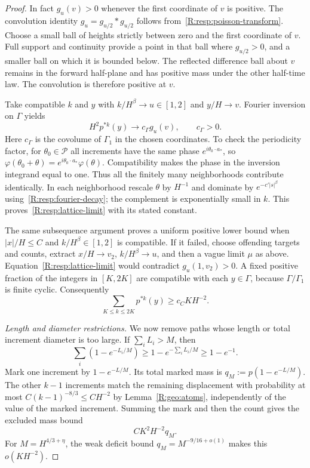 \begin{proof}
In fact $g_u(v)>0$ whenever the first coordinate of $v$ is positive. The convolution identity $g_u=g_{u/2}*g_{u/2}$ follows from~\eqref{R:resp:poisson-transform}. Choose a small ball of heights strictly between zero and the first coordinate of $v$. Full support and continuity provide a point in that ball where $g_{u/2}>0$, and a smaller ball on which it is bounded below. The reflected difference ball about $v$ remains in the forward half-plane and has positive mass under the other half-time law. The convolution is therefore positive at $v$.

Take compatible $k$ and $y$ with $k/H^\beta\to u\in[1,2]$ and $y/H\to v$. Fourier inversion on $\Gamma$ yields
\begin{equation}
 H^2p^{*k}(y)\longrightarrow c_\Gamma g_u(v),
 \qquad c_\Gamma>0.
 \label{R:resp:lattice-limit}
\end{equation}
Here $c_\Gamma$ is the covolume of $\Gamma_1$ in the chosen coordinates. To check the periodicity factor, for $\theta_0\in\mathcal P$ all increments have the same phase $e^{i\theta_0\cdot a_*}$, so
$\varphi(\theta_0+\theta)=e^{i\theta_0\cdot a_*}\varphi(\theta)$. Compatibility makes the phase in the inversion integrand equal to one. Thus all the finitely many neighborhoods contribute identically. In each neighborhood rescale $\theta$ by $H^{-1}$ and dominate by $e^{-c'|s|^\beta}$ using~\eqref{R:resp:fourier-decay}; the complement is exponentially small in $k$. This proves~\eqref{R:resp:lattice-limit} with its stated constant.

The same subsequence argument proves a uniform positive lower bound when $|x|/H\le C$ and $k/H^\beta\in[1,2]$ is compatible. If it failed, choose offending targets and counts, extract $x/H\to v_2$, $k/H^\beta\to u$, and then a vague limit $\mu$ as above. Equation~\eqref{R:resp:lattice-limit} would contradict $g_u(1,v_2)>0$. A fixed positive fraction of the integers in $[K,2K]$ are compatible with each $y\in\Gamma$, because $\Gamma/\Gamma_1$ is finite cyclic. Consequently
\begin{equation}
 \sum_{K\le k\le2K}p^{*k}(y)\ge c_CKH^{-2}.
 \label{R:resp:unrestricted-point}
\end{equation}

\emph{Length and diameter restrictions.} We now remove paths whose length or total increment diameter is too large. If $\sum_iL_i>M$, then
\[
 \sum_i(1-e^{-L_i/M})\ge1-e^{-\sum_iL_i/M}\ge1-e^{-1}.
\]
Mark one increment by $1-e^{-L/M}$. Its total marked mass is $q_M:=p(1-e^{-L/M})$. The other $k-1$ increments match the remaining displacement with probability at most $C(k-1)^{-8/3}\le CH^{-2}$ by Lemma~\ref{R:geo:atoms}, independently of the value of the marked increment. Summing the mark and then the count gives the excluded mass bound
\[
 C K^2H^{-2}q_M.
\]
For $M=H^{4/3+\eta}$, the weak deficit bound $q_M=M^{-9/16+o(1)}$ makes this $o(KH^{-2})$.


\end{proof}
